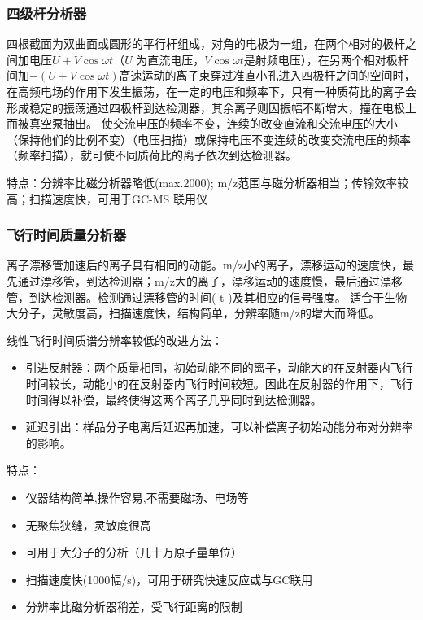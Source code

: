 \subsubsection*{四级杆分析器}
四根截面为双曲面或圆形的平行杆组成，对角的电极为一组，在两个相对的极杆之间加电压$U+V\cos\omega t$（$U$ 为直流电压，$V\cos\omega t$是射频电压），在另两个相对极杆间加$-(U+V\cos\omega t)$高速运动的离子束穿过准直小孔进入四极杆之间的空间时，在高频电场的作用下发生振荡，在一定的电压和频率下，只有一种质荷比的离子会形成稳定的振荡通过四极杆到达检测器，其余离子则因振幅不断增大，撞在电极上而被真空泵抽出。 使交流电压的频率不变，连续的改变直流和交流电压的大小（保持他们的比例不变）（电压扫描）或保持电压不变连续的改变交流电压的频率（频率扫描），就可使不同质荷比的离子依次到达检测器。

特点：分辨率比磁分析器略低(max.2000); m/z范围与磁分析器相当；传输效率较高；扫描速度快，可用于GC-MS 联用仪

\subsubsection*{飞行时间质量分析器}
离子漂移管加速后的离子具有相同的动能。m/z小的离子，漂移运动的速度快，最先通过漂移管，到达检测器；m/z大的离子，漂移运动的速度慢，最后通过漂移管，到达检测器。检测通过漂移管的时间( t )及其相应的信号强度。
适合于生物大分子，灵敏度高，扫描速度快，结构简单，分辨率随m/z的增大而降低。

线性飞行时间质谱分辨率较低的改进方法： 
\begin{itemize}
    \item  引进反射器：两个质量相同，初始动能不同的离子，动能大的在反射器内飞行时间较长，动能小的在反射器内飞行时间较短。因此在反射器的作用下，飞行时间得以补偿，最终使得这两个离子几乎同时到达检测器。
    \item 延迟引出：样品分子电离后延迟再加速，可以补偿离子初始动能分布对分辨率的影响。
\end{itemize}

特点：
\begin{itemize}
    \item 仪器结构简单,操作容易,不需要磁场、电场等
    \item 无聚焦狭缝，灵敏度很高
    \item 可用于大分子的分析（几十万原子量单位）
    \item 扫描速度快(1000幅/s)，可用于研究快速反应或与GC联用
    \item 分辨率比磁分析器稍差，受飞行距离的限制
\end{itemize}

